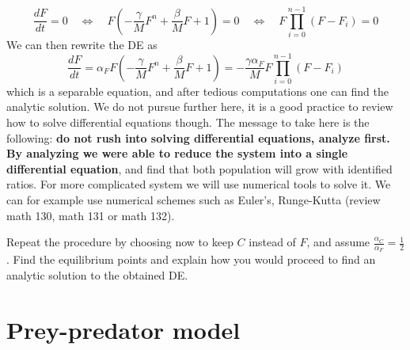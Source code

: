 \[\displaystyle  \frac{dF}{dt} =   0  \quad \Longleftrightarrow \quad  F\left( - \frac{ \gamma}{M}  F^n + \frac{\beta}{M} F  +1\right)  = 0 \quad \Longleftrightarrow \quad  F \prod \limits_{i = 0}^{n-1} (F - F_i) = 0
\]
We can then rewrite the DE as 
\[
\displaystyle  \frac{dF}{dt} = \alpha_F F  \left( - \frac{ \gamma}{M}  F^n + \frac{\beta}{M} F  +1\right)  = - \frac{ \gamma  \alpha_F}{M} F\prod \limits_{i = 0}^{n-1} (F - F_i)  \]
which is a separable equation, and after tedious computations one can find the analytic solution. We do not pursue further here, it is a good practice to review how to solve differential equations though. The message to take here is the following: \textbf{do not rush into solving differential equations, analyze first. By analyzing we were able to reduce the system into a single differential equation}, and find that both population will grow with identified ratios. For more complicated system we will use numerical tools to solve it. We can for example use numerical schemes such as Euler's, Runge-Kutta (review math 130, math 131 or math 132). 
 \begin{Exercise}
 Repeat the procedure by choosing now to keep $C$ instead of $F$, and assume $\frac{\alpha_C}{ \alpha_F}  = \frac{1}{2}$. Find the equilibrium points and explain how you would proceed to find an analytic solution to the obtained DE.\\
  \dotfill

\dotfill

\dotfill

\dotfill

\dotfill

\dotfill

\dotfill

\dotfill

\dotfill

\dotfill
 \end{Exercise}

\section{Prey-predator model}


